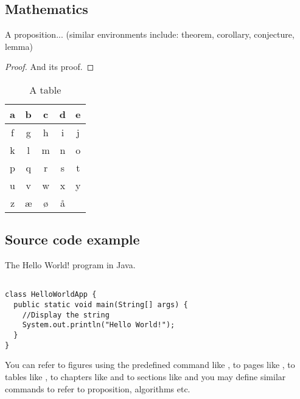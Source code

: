\subsection{Mathematics}



\begin{proposition}\label{def:a_proposition}
A proposition... (similar environments include: theorem, corollary, conjecture, lemma)

\end{proposition}

\begin{proof}
\vspace*{-1em} %
And its proof.
\end{proof}

\begin{table}
\caption{\label{tab:example}A table}
\centering
\begin{tabular}[b]{| c | c | c | c | c |}
\hline
a & b & c & d & e \\ \hline
f & g & h & i & j \\ \hline
k & l & m & n & o \\ \hline
p & q & r & s & t \\ \hline
u & v & w & x & y \\ \hline
z & æ & ø & å &   \\ \hline
\end{tabular} 
\end{table}

\subsection{Source code example}

\begin{algorithm}[h]
  \caption{The Hello World! program in Java.}
  \label{hello_world}
  \begin{verbatim}
  
class HelloWorldApp {
  public static void main(String[] args) {
    //Display the string
    System.out.println("Hello World!");
  }
}
\end{verbatim}
\end{algorithm}

You can refer to figures using the predefined command like , to pages like , to tables like , to chapters like  and to sections like  and you may define similar commands to refer to proposition, algorithms etc.

